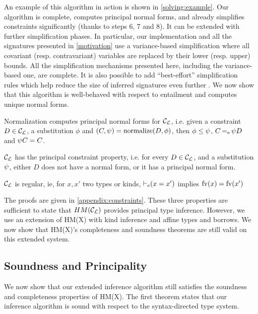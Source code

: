 An example of this algorithm in action is shown in \cref{solving:example}.
Our algorithm is complete, computes principal normal forms,
and already simplifies constraints significantly
(thanks to steps 6, 7 and 8).
It can be extended with further simplification phases.
In particular, our implementation and all the signatures presented in
\cref{motivation} use a variance-based simplification
where all covariant (resp. contravariant) variables are replaced by their
lower (resp. upper) bounds.
All the simplification mechanisms presented
here, including the variance-based one, are complete.
It is also possible to add ``best-effort'' simplification
rules which help reduce the size of inferred signatures even further
\citep{DBLP:conf/aplas/Simonet03}.
%
We now show that this algorithm is well-behaved with respect to entailment
and computes unique normal forms.

\begin{property}
  Normalization computes principal normal forms for ${\mathcal C_{\mathcal L}}$, i.e.
  given a constraint $D\in{\mathcal C_{\mathcal L}}$, a substitution $\phi$ and
  $(C,\mathrm{\psi}) = \operatorname{normalize}(D,\phi)$,
  then $\phi\leq\mathrm{\psi}$,
  $C \operatorname{=_e} \mathrm{\psi} D$ and
  $\mathrm{\psi} C = C$.
\end{property}

\begin{property}
  ${\mathcal C_{\mathcal L}}$ has the principal constraint property, i.e.
  for every $D\in{\mathcal C_{\mathcal L}}$, and a substitution $\mathrm{\psi}$,
  either $D$ does not have a normal form, or it has
  a principal normal form.
\end{property}

\begin{property}
  ${\mathcal C_{\mathcal L}}$ is regular, ie, for $x, x'$ two types or kinds,
  $\operatorname{\vdash_e} (x = x')$ implies
  $\operatorname{fv}(x) = \operatorname{fv}(x')$
\end{property}

The proofs are given in \cref{appendix:constraints}. These three properties
are sufficient to state that $HM({\mathcal C_{\mathcal L}})$ provides principal type inference.
However, we use an extension of HM(X) with kind inference
and affine types and borrows.
We now show that HM(X)'s completeness and soundness theorems are still valid on
this extended system.

\subsection{Soundness and Principality}

We now show that our extended inference algorithm still satisfies the soundness
and completeness properties of HM(X).
%
The first theorem states that our inference algorithm is sound
with respect to the syntax-directed type system.

